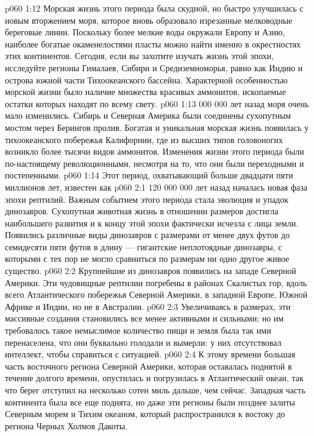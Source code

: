 \vs p060 1:12 Морская жизнь этого периода была скудной, но быстро улучшилась с новым вторжением моря, которое вновь образовало изрезанные мелководные береговые линии. Поскольку более мелкие воды окружали Европу и Азию, наиболее богатые окаменелостями пласты можно найти именно в окрестностях этих континентов. Сегодня, если вы захотите изучать жизнь этой эпохи, исследуйте регионы Гималаев, Сибири и Средиземноморья, равно как Индию и острова южной части Тихоокеанского бассейна. Характерной особенностью морской жизни было наличие множества красивых аммонитов, ископаемые остатки которых находят по всему свету.
\vs p060 1:13  000 000 лет назад моря очень мало изменились. Сибирь и Северная Америка были соединены сухопутным мостом через Берингов пролив. Богатая и уникальная морская жизнь появилась у тихоокеанского побережья Калифорнии, где из высших типов головоногих возникло более тысячи видов аммонитов. Изменения жизни этого периода были по\hyp{}настоящему революционными, несмотря на то, что они были переходными и постепенными.
\vs p060 1:14 \pc Этот период, охватывающий больше двадцати пяти миллионов лет, известен как 
\vs p060 2:1 120 000 000 лет назад началась новая фаза эпохи рептилий. Важным событием этого периода стала эволюция и упадок динозавров. Сухопутная животная жизнь в отношении размеров достигла наибольшего развития и к концу этой эпохи фактически исчезла с лица земли. Появились различные виды динозавров с размерами от менее двух футов до семидесяти пяти футов в длину --- гигантские неплотоядные динозавры, с которыми с тех пор не могло сравниться по размерам ни одно другое живое существо.
\vs p060 2:2 Крупнейшие из динозавров появились на западе Северной Америки. Эти чудовищные рептилии погребены в районах Скалистых гор, вдоль всего Атлантического побережья Северной Америки, в западной Европе, Южной Африке и Индии, но не в Австралии.
\vs p060 2:3 Увеличиваясь в размерах, эти массивные создания становились все менее активными и сильными; но им требовалось такое немыслимое количество пищи и земля была так ими перенаселена, что они буквально голодали и вымерли: у них отсутствовал интеллект, чтобы справиться с ситуацией.
\vs p060 2:4 К этому времени большая часть восточного региона Северной Америки, которая оставалась поднятой в течение долгого времени, опустилась и погрузилась в Атлантический океан, так что берег отступил на несколько сотен миль дальше, чем сейчас. Западная часть континента была все еще поднята, но даже эти регионы были позднее залиты Северным морем и Тихим океаном, который распространился к востоку до региона Черных Холмов Дакоты.
